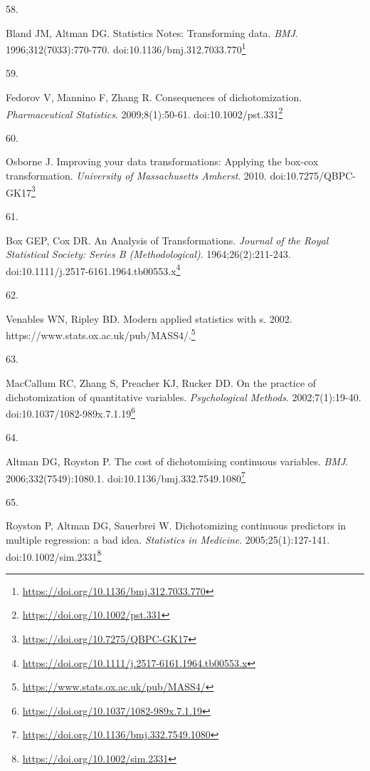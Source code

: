 \documentclass[
  a4paper,
]{book}
\newlength{\cslhangindent}
\newlength{\csllabelwidth}
\newlength{\cslentryspacingunit} %
\newenvironment{CSLReferences}[2] %
 {%
  \setlength{\parindent}{0pt}
  \ifodd #1
  \let\oldpar\par
  \def\par{\hangindent=\cslhangindent\oldpar}
  \fi
  \setlength{\parskip}{#2\cslentryspacingunit}
 }%
 {}
\newcommand{\CSLLeftMargin}[1]{\parbox[t]{\csllabelwidth}{#1}}
\newcommand{\CSLRightInline}[1]{\parbox[t]{\linewidth - \csllabelwidth}{#1}\break}
\renewcommand{\href}[2]{#2\footnote{\url{#1}}}
\begin{document}
\begin{CSLReferences}{0}{0}
\leavevmode{}%
\CSLLeftMargin{58. }%
\CSLRightInline{Bland JM, Altman DG. Statistics Notes: Transforming data. \emph{BMJ}. 1996;312(7033):770-770. doi:\href{https://doi.org/10.1136/bmj.312.7033.770}{10.1136/bmj.312.7033.770}}

\leavevmode{}%
\CSLLeftMargin{59. }%
\CSLRightInline{Fedorov V, Mannino F, Zhang R. Consequences of dichotomization. \emph{Pharmaceutical Statistics}. 2009;8(1):50-61. doi:\href{https://doi.org/10.1002/pst.331}{10.1002/pst.331}}

\leavevmode{}%
\CSLLeftMargin{60. }%
\CSLRightInline{Osborne J. Improving your data transformations: Applying the box-cox transformation. \emph{University of Massachusetts Amherst}. 2010. doi:\href{https://doi.org/10.7275/QBPC-GK17}{10.7275/QBPC-GK17}}

\leavevmode{}%
\CSLLeftMargin{61. }%
\CSLRightInline{Box GEP, Cox DR. An Analysis of Transformations. \emph{Journal of the Royal Statistical Society: Series B (Methodological)}. 1964;26(2):211-243. doi:\href{https://doi.org/10.1111/j.2517-6161.1964.tb00553.x}{10.1111/j.2517-6161.1964.tb00553.x}}

\leavevmode{}%
\CSLLeftMargin{62. }%
\CSLRightInline{Venables WN, Ripley BD. Modern applied statistics with s. 2002. \href{https://www.stats.ox.ac.uk/pub/MASS4/}{https://www.stats.ox.ac.uk/pub/MASS4/.}}

\leavevmode{}%
\CSLLeftMargin{63. }%
\CSLRightInline{MacCallum RC, Zhang S, Preacher KJ, Rucker DD. On the practice of dichotomization of quantitative variables. \emph{Psychological Methods}. 2002;7(1):19-40. doi:\href{https://doi.org/10.1037/1082-989x.7.1.19}{10.1037/1082-989x.7.1.19}}

\leavevmode{}%
\CSLLeftMargin{64. }%
\CSLRightInline{Altman DG, Royston P. The cost of dichotomising continuous variables. \emph{BMJ}. 2006;332(7549):1080.1. doi:\href{https://doi.org/10.1136/bmj.332.7549.1080}{10.1136/bmj.332.7549.1080}}

\leavevmode{}%
\CSLLeftMargin{65. }%
\CSLRightInline{Royston P, Altman DG, Sauerbrei W. Dichotomizing continuous predictors in multiple regression: a bad idea. \emph{Statistics in Medicine}. 2005;25(1):127-141. doi:\href{https://doi.org/10.1002/sim.2331}{10.1002/sim.2331}}


\end{CSLReferences}
\end{document}
